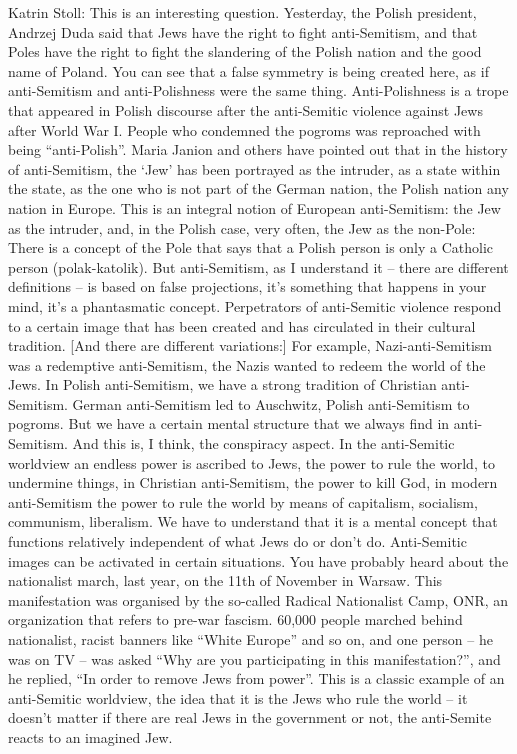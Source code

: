 Katrin Stoll: This is an interesting question. Yesterday, the Polish president, Andrzej Duda said that Jews have the right to fight anti-Semitism, and that Poles have the right to fight the slandering of the Polish nation and the good name of Poland. You can see that a false symmetry is being created here, as if anti-Semitism and anti-Polishness were the same thing. Anti-Polishness is a trope that appeared in Polish discourse after the anti-Semitic violence against Jews after World War I. People who condemned the pogroms was reproached with being “anti-Polish”. Maria Janion and others have pointed out that in the history of anti-Semitism, the ‘Jew’ has been portrayed as the intruder, as a state within the state, as the one who is not part of the German nation, the Polish nation any nation in Europe. This is an integral notion of European anti-Semitism: the Jew as the intruder, and, in the Polish case, very often, the Jew as the non-Pole: There is a concept of the Pole that says that a Polish person is only a Catholic person (polak-katolik). But anti-Semitism, as I understand it – there are different definitions – is based on false projections, it’s something that happens in your mind, it’s a phantasmatic concept. Perpetrators of anti-Semitic violence respond to a certain image that has been created and has circulated in their cultural tradition. [And there are different variations:] For example, Nazi-anti-Semitism was a redemptive anti-Semitism, the Nazis wanted to redeem the world of the Jews. In Polish anti-Semitism, we have a strong tradition of Christian anti-Semitism. German anti-Semitism led to Auschwitz, Polish anti-Semitism to pogroms. But we have a certain mental structure that we always find in anti-Semitism. And this is, I think, the conspiracy aspect. In the anti-Semitic worldview an endless power is ascribed to Jews, the power to rule the world, to undermine things, in Christian anti-Semitism, the power to kill God, in modern anti-Semitism the power to rule the world by means of capitalism, socialism, communism, liberalism. We have to understand that it is a mental concept that functions relatively independent of what Jews do or don’t do. Anti-Semitic images can be activated in certain situations. You have probably heard about the nationalist march, last year, on the 11th of November in Warsaw. This manifestation was organised by the so-called Radical Nationalist Camp, ONR, an organization that refers to pre-war fascism. 60,000 people marched behind nationalist, racist banners like “White Europe” and so on, and one person – he was on TV – was asked “Why are you participating in this manifestation?”, and he replied, “In order to remove Jews from power”. This is a classic example of an anti-Semitic worldview, the idea that it is the Jews who rule the world – it doesn’t matter if there are real Jews in the government or not, the anti-Semite reacts to an imagined Jew.  

